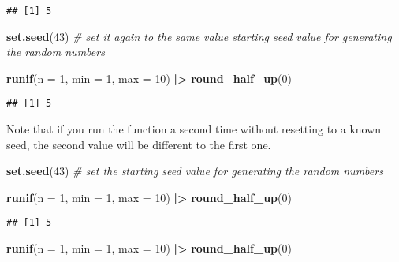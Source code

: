 \documentclass[
]{article}
\newenvironment{Shaded}{\begin{snugshade}}{\end{snugshade}}
\newcommand{\AttributeTok}[1]{\textcolor[rgb]{0.13,0.29,0.53}{#1}}
\newcommand{\CommentTok}[1]{\textcolor[rgb]{0.56,0.35,0.01}{\textit{#1}}}
\newcommand{\DecValTok}[1]{\textcolor[rgb]{0.00,0.00,0.81}{#1}}
\newcommand{\FunctionTok}[1]{\textcolor[rgb]{0.13,0.29,0.53}{\textbf{#1}}}
\newcommand{\NormalTok}[1]{#1}
\newcommand{\SpecialCharTok}[1]{\textcolor[rgb]{0.81,0.36,0.00}{\textbf{#1}}}
\begin{document}
\begin{verbatim}
## [1] 5
\end{verbatim}

\begin{Shaded}
\begin{Highlighting}[]
\FunctionTok{set.seed}\NormalTok{(}\DecValTok{43}\NormalTok{) }\CommentTok{\# set it again to the same value starting seed value for generating the random numbers}

\FunctionTok{runif}\NormalTok{(}\AttributeTok{n =} \DecValTok{1}\NormalTok{, }
      \AttributeTok{min =} \DecValTok{1}\NormalTok{,}
      \AttributeTok{max =} \DecValTok{10}\NormalTok{) }\SpecialCharTok{|\textgreater{}}
  \FunctionTok{round\_half\_up}\NormalTok{(}\DecValTok{0}\NormalTok{)}
\end{Highlighting}
\end{Shaded}

\begin{verbatim}
## [1] 5
\end{verbatim}

Note that if you run the function a second time without resetting to a
known seed, the second value will be different to the first one.

\begin{Shaded}
\begin{Highlighting}[]
\FunctionTok{set.seed}\NormalTok{(}\DecValTok{43}\NormalTok{) }\CommentTok{\# set the starting seed value for generating the random numbers}

\FunctionTok{runif}\NormalTok{(}\AttributeTok{n =} \DecValTok{1}\NormalTok{, }
      \AttributeTok{min =} \DecValTok{1}\NormalTok{,}
      \AttributeTok{max =} \DecValTok{10}\NormalTok{) }\SpecialCharTok{|\textgreater{}}
  \FunctionTok{round\_half\_up}\NormalTok{(}\DecValTok{0}\NormalTok{)}
\end{Highlighting}
\end{Shaded}

\begin{verbatim}
## [1] 5
\end{verbatim}

\begin{Shaded}
\begin{Highlighting}[]
\FunctionTok{runif}\NormalTok{(}\AttributeTok{n =} \DecValTok{1}\NormalTok{, }
      \AttributeTok{min =} \DecValTok{1}\NormalTok{,}
      \AttributeTok{max =} \DecValTok{10}\NormalTok{) }\SpecialCharTok{|\textgreater{}}
  \FunctionTok{round\_half\_up}\NormalTok{(}\DecValTok{0}\NormalTok{)}
\end{Highlighting}
\end{Shaded}
\end{document}
